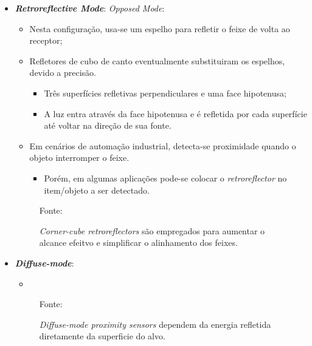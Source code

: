 \documentclass[xcolor=dvipsnames, aspectratio=169]{beamer}
\begin{document}
\begin{frame}
\begin{itemize}
		\newpage
		\item \textbf{\textit{Retroreflective Mode}}:
		\textit{Opposed Mode}:
		\begin{itemize}
			\item Nesta configuração, usa-se um espelho para refletir o feixe de volta ao receptor;
			\item Refletores de cubo de canto eventualmente substituiram os espelhos, devido a precisão.
			\begin{itemize}
				\item Três superfícies refletivas perpendiculares e uma face hipotenusa;
				\item A luz entra através da face hipotenusa e é refletida por cada superfície até voltar na direção de sua fonte.
			\end{itemize}
			\item Em cenários de automação industrial, detecta-se proximidade quando o objeto interromper o feixe.
			\begin{itemize}
				\item Porém, em algumas aplicações pode-se colocar o \textit{retroreflector} no item/objeto a ser detectado.
			\end{itemize} 
		\end{itemize}
		\begin{figure}
			\centering
			{Fonte: \cite{everett1995sensors}}
			\caption{\textit{Corner-cube retroreflectors} são empregados para aumentar o alcance efeitvo e simplificar o alinhamento dos feixes.}
			\label{fig:9_optical_sensor_retroreflective_mode}
		\end{figure}

		\newpage
		\item \textbf{\textit{Diffuse-mode}}:
		\begin{itemize}
			\item 
		\end{itemize}
		\begin{figure}
			\centering
			{Fonte: \cite{everett1995sensors}}
			\caption{\textit{Diffuse-mode proximity sensors} dependem da energia refletida diretamente da superficie do alvo.}
			\label{fig:10_optical_sensor_diffuse_mode}
		\end{figure}


\end{itemize}
\end{frame}
\end{document}
